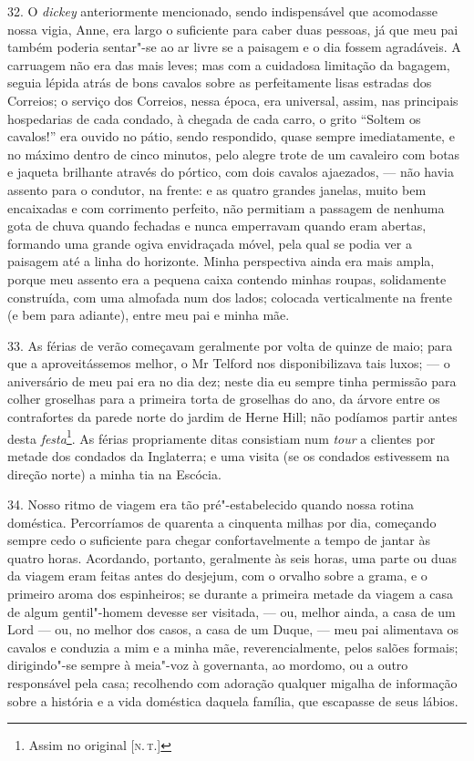 32. O \emph{dickey} anteriormente mencionado, sendo indispensável que
acomodasse nossa vigia, Anne, era largo o suficiente para caber duas
pessoas, já que meu pai também poderia sentar"-se ao ar livre se a
paisagem e o dia fossem agradáveis. A carruagem não era das mais leves;
mas com a cuidadosa limitação da bagagem, seguia lépida atrás de bons
cavalos sobre as perfeitamente lisas estradas dos Correios; o serviço
dos Correios, nessa época, era universal, assim, nas principais
hospedarias de cada condado, à chegada de cada carro, o grito ``Soltem
os cavalos!'' era ouvido no pátio, sendo respondido, quase sempre
imediatamente, e no máximo dentro de cinco minutos, pelo alegre trote de
um cavaleiro com botas e jaqueta brilhante através do pórtico, com dois
cavalos ajaezados, --- não havia assento para o condutor, na frente: e as
quatro grandes janelas, muito bem encaixadas e com corrimento perfeito,
não permitiam a passagem de nenhuma gota de chuva quando fechadas e
nunca emperravam quando eram abertas, formando uma grande ogiva
envidraçada móvel, pela qual se podia ver a paisagem até a linha do
horizonte. Minha perspectiva ainda era mais ampla, porque meu assento
era a pequena caixa contendo minhas roupas, solidamente construída, com
uma almofada num dos lados; colocada verticalmente na frente (e bem para
adiante), entre meu pai e minha mãe.

33. As férias de verão começavam geralmente por volta de quinze de maio;
para que a aproveitássemos melhor, o Mr Telford nos disponibilizava tais
luxos; --- o aniversário de meu pai era no dia dez; neste dia eu sempre
tinha permissão para colher groselhas para a primeira torta de groselhas
do ano, da árvore entre os contrafortes da parede norte do jardim de
Herne Hill; não podíamos partir antes desta \emph{festa}\footnote{Assim
  no original {[}\textsc{n.\,t.}{]}}. As férias propriamente ditas
consistiam num \emph{tour} a clientes por metade dos condados da
Inglaterra; e uma visita (se os condados estivessem na direção norte) a
minha tia na Escócia.

34. Nosso ritmo de viagem era tão pré"-estabelecido quando nossa rotina
doméstica. Percorríamos de quarenta a cinquenta milhas por dia,
começando sempre cedo o suficiente para chegar confortavelmente a tempo
de jantar às quatro horas. Acordando, portanto, geralmente às seis
horas, uma parte ou duas da viagem eram feitas antes do desjejum, com o
orvalho sobre a grama, e o primeiro aroma dos espinheiros; se durante a
primeira metade da viagem a casa de algum gentil"-homem devesse ser
visitada, --- ou, melhor ainda, a casa de um Lord --- ou, no melhor dos
casos, a casa de um Duque, --- meu pai alimentava os cavalos e conduzia a
mim e a minha mãe, reverencialmente, pelos salões formais; dirigindo"-se
sempre à meia"-voz à governanta, ao mordomo, ou a outro responsável pela
casa; recolhendo com adoração qualquer migalha de informação sobre a
história e a vida doméstica daquela família, que escapasse de seus
lábios.

